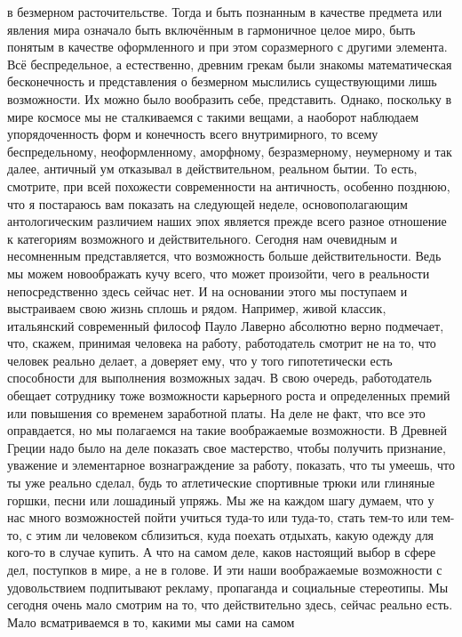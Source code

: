 в безмерном расточительстве. Тогда и быть познанным в качестве предмета или
явления мира означало быть включённым в гармоничное целое миро, быть понятым в
качестве оформленного и при этом соразмерного с другими элемента. Всё
беспредельное, а естественно, древним грекам были знакомы математическая
бесконечность и представления о безмерном мыслились существующими лишь
возможности. Их можно было вообразить себе, представить. Однако, поскольку в
мире космосе мы не сталкиваемся с такими вещами, а наоборот наблюдаем
упорядоченность форм и конечность всего внутримирного, то всему беспредельному,
неоформленному, аморфному, безразмерному, неумерному и так далее, античный ум
отказывал в действительном, реальном бытии. То есть, смотрите, при всей
похожести современности на античность, особенно позднюю, что я постараюсь вам
показать на следующей неделе, основополагающим антологическим различием наших
эпох является прежде всего разное отношение к категориям возможного и
действительного. Сегодня нам очевидным и несомненным представляется, что
возможность больше действительности. Ведь мы можем новоображать кучу всего, что
может произойти, чего в реальности непосредственно здесь сейчас нет. И на
основании этого мы поступаем и выстраиваем свою жизнь сплошь и рядом. Например,
живой классик, итальянский современный философ Пауло Лаверно абсолютно верно
подмечает, что, скажем, принимая человека на работу, работодатель смотрит не на
то, что человек реально делает, а доверяет ему, что у того гипотетически есть
способности для выполнения возможных задач. В свою очередь, работодатель обещает
сотруднику тоже возможности карьерного роста и определенных премий или повышения
со временем заработной платы. На деле не факт, что все это оправдается, но мы
полагаемся на такие воображаемые возможности. В Древней Греции надо было на деле
показать свое мастерство, чтобы получить признание, уважение и элементарное
вознаграждение за работу, показать, что ты умеешь, что ты уже реально сделал,
будь то атлетические спортивные трюки или глиняные горшки, песни или лошадиный
упряжь. Мы же на каждом шагу думаем, что у нас много возможностей пойти учиться
туда-то или туда-то, стать тем-то или тем-то, с этим ли человеком сблизиться,
куда поехать отдыхать, какую одежду для кого-то в случае купить. А что на самом
деле, каков настоящий выбор в сфере дел, поступков в мире, а не в голове. И эти
наши воображаемые возможности с удовольствием подпитывают рекламу, пропаганда и
социальные стереотипы. Мы сегодня очень мало смотрим на то, что действительно
здесь, сейчас реально есть. Мало всматриваемся в то, какими мы сами на самом
